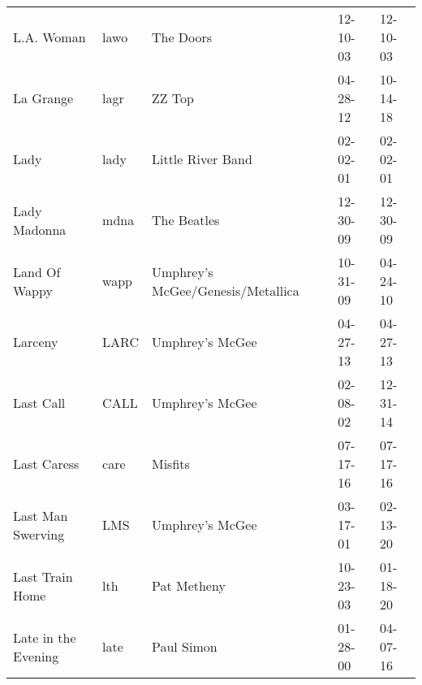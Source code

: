 \begin{longtable}{p{}p{}p{}p{}p{}}
                                                              L.A. Woman &          lawo &                                                The Doors &              12-10-03 &             12-10-03 \\
                                                               La Grange &          lagr &                                                   ZZ Top &              04-28-12 &             10-14-18 \\
                                                                    Lady &          lady &                                        Little River Band &              02-02-01 &             02-02-01 \\
                                                            Lady Madonna &          mdna &                                              The Beatles &              12-30-09 &             12-30-09 \\
                                                           Land Of Wappy &          wapp &                        Umphrey's McGee/Genesis/Metallica &              10-31-09 &             04-24-10 \\
                                                                 Larceny &          LARC &                                          Umphrey's McGee &              04-27-13 &             04-27-13 \\
                                                               Last Call &          CALL &                                          Umphrey's McGee &              02-08-02 &             12-31-14 \\
                                                             Last Caress &          care &                                                  Misfits &              07-17-16 &             07-17-16 \\
                                                       Last Man Swerving &           LMS &                                          Umphrey's McGee &              03-17-01 &             02-13-20 \\
                                                         Last Train Home &           lth &                                              Pat Metheny &              10-23-03 &             01-18-20 \\
                                                     Late in the Evening &          late &                                               Paul Simon &              01-28-00 &             04-07-16 \\

\end{longtable}
